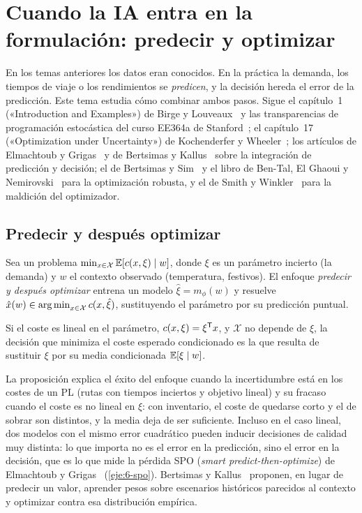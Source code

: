 \chapter{Cuando la IA entra en la formulación: predecir y optimizar}
\label{tema:6}

En los temas anteriores los datos eran conocidos. En la práctica la demanda, los tiempos de viaje o los rendimientos se \emph{predicen}, y la decisión hereda el error de la predicción. Este tema estudia cómo combinar ambos pasos. Sigue el capítulo~1 («Introduction and Examples») de Birge y Louveaux~\cite{bl} y las transparencias de programación estocástica del curso EE364a de Stanford~\cite{ee364stoch}; el capítulo~17 («Optimization under Uncertainty») de Kochenderfer y Wheeler~\cite{kw}; los artículos de Elmachtoub y Grigas~\cite{spo} y de Bertsimas y Kallus~\cite{bk} sobre la integración de predicción y decisión; el de Bertsimas y Sim~\cite{bsim} y el libro de Ben-Tal, El Ghaoui y Nemirovski~\cite{btn} para la optimización robusta, y el de Smith y Winkler~\cite{smith} para la maldición del optimizador.

\section{Predecir y después optimizar}

\begin{definicion}\label{def:pto}
Sea un problema $\min_{x\in\mathcal{X}}\mathbb{E}[c(x,\xi)\mid w]$, donde $\xi$ es un parámetro incierto (la demanda) y $w$ el contexto observado (temperatura, festivos). El enfoque \emph{predecir y después optimizar} entrena un modelo $\hat\xi=m_\phi(w)$ y resuelve $\hat x(w)\in\operatorname*{arg\,min}_{x\in\mathcal{X}}c(x,\hat\xi)$, sustituyendo el parámetro por su predicción puntual.
\end{definicion}

\begin{proposicion}\label{prop:lineal}
Si el coste es lineal en el parámetro, $c(x,\xi)=\xi^{\mathsf{T}} x$, y $\mathcal{X}$ no depende de $\xi$, la decisión que minimiza el coste esperado condicionado es la que resulta de sustituir $\xi$ por su media condicionada $\mathbb{E}[\xi\mid w]$.
\end{proposicion}

La proposición explica el éxito del enfoque cuando la incertidumbre está en los costes de un PL (rutas con tiempos inciertos y objetivo lineal) y su fracaso cuando el coste es no lineal en $\xi$: con inventario, el coste de quedarse corto y el de sobrar son distintos, y la media deja de ser suficiente. Incluso en el caso lineal, dos modelos con el mismo error cuadrático pueden inducir decisiones de calidad muy distinta: lo que importa no es el error en la predicción, sino el error en la decisión, que es lo que mide la pérdida SPO (\emph{smart predict-then-optimize}) de Elmachtoub y Grigas~\cite{spo} (\cref{eje:6-spo}). Bertsimas y Kallus~\cite{bk} proponen, en lugar de predecir un valor, aprender pesos sobre escenarios históricos parecidos al contexto y optimizar contra esa distribución empírica.

